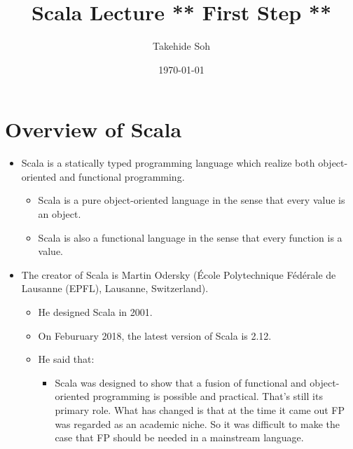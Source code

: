 \documentclass[11pt]{article}
\author{Takehide Soh}
\date{\today}
\title{Scala Lecture ** First Step  **}
\begin{document}
\maketitle
\setcounter{tocdepth}{1}
\tableofcontents


\section*{Overview of Scala}
\label{sec:orgheadline2}
\begin{itemize}
\item Scala is a statically typed programming language which realize
both object-oriented and functional programming.
\begin{itemize}
\item Scala is a pure object-oriented language in the sense that every value is an object.
\item Scala is also a functional language in the sense that every function is a value.
\end{itemize}

\item The creator of Scala is Martin Odersky (École Polytechnique
Fédérale de Lausanne (EPFL), Lausanne, Switzerland).
\begin{itemize}
\item He designed Scala in 2001.
\item On Feburuary 2018, the latest version of Scala is 2.12.
\item He said that:
\begin{itemize}
\item Scala was designed to show that a fusion of functional and
object-oriented programming is possible and practical. That’s
still its primary role. What has changed is that at the time it
came out FP was regarded as an academic niche. So it was
difficult to make the case that FP should be needed in a
mainstream language.
\end{itemize}
\end{itemize}


\end{itemize}
\end{document}
